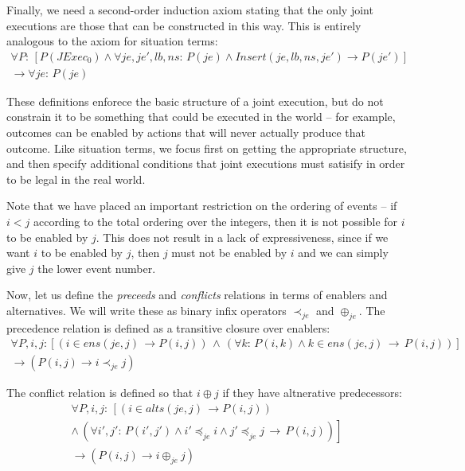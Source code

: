 Finally, we need a second-order induction axiom stating that the only
joint executions are those that can be constructed in this way. This
is entirely analogous to the axiom for situation terms:\begin{multline*}
\forall P:\,\left[P(JExec_{0})\wedge\forall je,je',lb,ns:\, P(je)\wedge Insert(je,lb,ns,je')\rightarrow P(je')\right]\\
\rightarrow\forall je:\, P(je)\end{multline*}


These definitions enforece the basic structure of a joint execution,
but do not constrain it to be something that could be executed in
the world -- for example, outcomes can be enabled by actions that
will never actually produce that outcome. Like situation terms, we
focus first on getting the appropriate structure, and then specify
additional conditions that joint executions must satisify in order
to be legal in the real world.

Note that we have placed an important restriction on the ordering
of events -- if $i<j$ according to the total ordering over the integers,
then it is not possible for $i$ to be enabled by $j$. This does
not result in a lack of expressiveness, since if we want $i$ to be
enabled by $j$, then $j$ must not be enabled by $i$ and we can
simply give $j$ the lower event number.

Now, let us define the \emph{preceeds} and \emph{conflicts} relations
in terms of enablers and alternatives. We will write these as binary
infix operators $\prec_{je}$ and $\oplus_{je}$. The precedence relation
is defined as a transitive closure over enablers:\begin{multline*}
\forall P,i,j:\left[\left(i\in ens(je,j)\,\rightarrow P(i,j)\right)\,\wedge\,\left(\forall k:\, P(i,k)\wedge k\in ens(je,j)\,\rightarrow\, P(i,j)\right)\right]\\
\rightarrow\left(P(i,j)\rightarrow i\prec_{je}j\right)\end{multline*}


The conflict relation is defined so that $i\oplus j$ if they have
altnerative predecessors:\begin{multline*}
\forall P,i,j:\,\left[\left(i\in alts(je,j)\,\rightarrow P(i,j)\right)\right.\\
\left.\wedge\,\left(\forall i',j':\, P(i',j')\wedge i'\preceq_{je}i\wedge j'\preceq_{je}j\,\rightarrow\, P(i,j)\right)\right]\\
\rightarrow\left(P(i,j)\rightarrow i\oplus_{je}j\right)\end{multline*}


